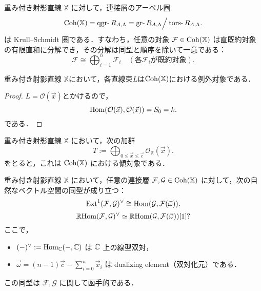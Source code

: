 \begin{thm}\cite{GL87}
重み付き射影直線 $\mathbb{X} $ に対して，連接層のアーベル圏
\[
\Coh(\mathbb{X}) = \qgr R_{A,\Lambda} = \gr R_{A,\Lambda}\Big{/}\tors R_{A,\Lambda}.
\]
は Krull--Schmidt 圏である．すなわち，任意の対象 $\mathcal{F} \in \operatorname{\mathrm{Coh}}(\mathbb{X})$ は直既約対象の有限直和に分解でき，その分解は同型と順序を除いて一意である：
\[
\mathcal{F} \cong \bigoplus_{i=1}^n \mathcal{F}_i \quad (\text{各} \mathcal{F}_i \text{が既約対象}).
\]
\end{thm}

\begin{lemm}
	重み付き射影直線 $\mathbb{X}$において，各直線束$L$は$\operatorname{\mathrm{Coh}}({\mathbb X})$における例外対象である．
\end{lemm}
\begin{proof}
	$L = \mathcal{O}(\vec{x})$とかけるので，
	\[\operatorname{\mathrm{Hom}}(\mathcal{O}(\vec{x}),\mathcal{O}(\vec{x}))=S_0=k.\]
	である．
\end{proof}

\begin{thm}\cite{GL87}
重み付き射影直線 $\mathbb{X}$ において，次の加群
\[
T := \bigoplus_{0 \le \vec{x} \le \vec{c}} \mathcal{O}_{\mathbb{X}}(\vec{x}).
\]
をとると，これは $\operatorname{\mathrm{Coh}}(\mathbb{X})$ における傾対象である．
\end{thm}

\begin{thm}\cite{GL87}
重み付き射影直線 $\mathbb{X}$ において，任意の連接層 $\mathcal{F}, \mathcal{G} \in \operatorname{\mathrm{Coh}}(\mathbb{X})$ に対して，次の自然なベクトル空間の同型が成り立つ：
\[
\operatorname{\mathrm{Ext}}^1(\mathcal{F}, \mathcal{G})^\vee \cong \operatorname{\mathrm{Hom}}(\mathcal{G}, \mathcal{F}(\vec{\omega})).
\]
\[
\operatorname{\mathbb{R}\mathrm{Hom}}({\mathcal F},{\mathcal G})^\vee \simeq \operatorname{\mathbb{R}\mathrm{Hom}}({\mathcal G},{\mathcal F}(\vec{\omega}))[1]?\]
ここで，
\begin{itemize}
	\item $(-)^\vee := \operatorname{\mathrm{Hom}}_{{\mathbb C}}(-, {\mathbb C})$ は ${\mathbb C}$ 上の線型双対，
  \item $\vec{\omega} = (n - 1)\vec{c} - \sum_{i=0}^n \vec{x}_i$ は dualizing element（双対化元）である．
\end{itemize}
この同型は $\mathcal{F}, \mathcal{G}$ に関して函手的である．
\end{thm}

